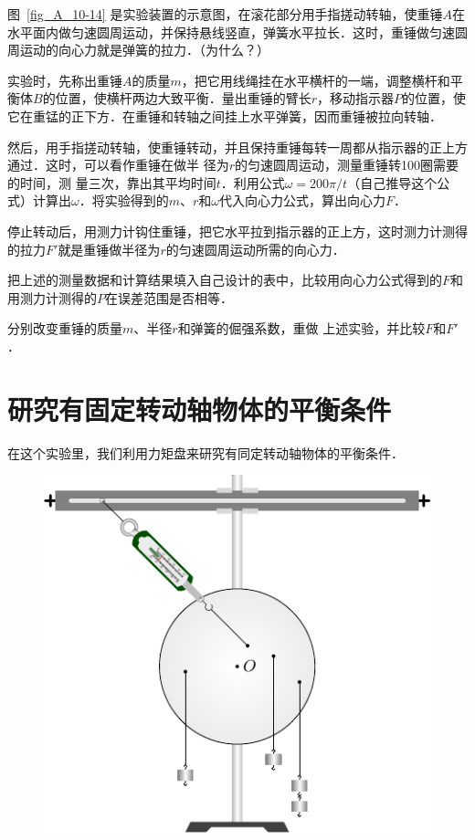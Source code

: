 图~\ref{fig_A_10-14} 是实验装置的示意图，在滚花部分用手指搓动转轴，使重锤$A$在水平面内做匀速圆周运动，并保持悬线竖直，弹簧水平拉长．这时，重锤做匀速圆周运动的向心力就是弹簧的拉力．（为什么？）

实验时，先称出重锤$A$的质量$m$，把它用线绳挂在水平横杆的一端，调整横杆和平衡体$B$的位置，使横杆两边大致平衡．量出重锤的臂长$r$，移动指示器$P$的位置，使它在重锰的正下方．在重锤和转轴之间挂上水平弹簧，因而重锤被拉向转轴．

然后，用手指搓动转轴，使重锤转动，并且保持重锤每转一周都从指示器的正上方通过．这时，可以看作重锤在做半
径为$r$的匀速圆周运动，测量重锤转100圈需要的时间，测
量三次，靠出其平均时间$t$．利用公式$\omega=200\pi/t$（自己推导这个公式）计算出$\omega$．将实验得到的$m$、$r$和$\omega$代入向心力公式，算出向心力$F$．

停止转动后，用测力计钩住重锤，把它水平拉到指示器的正上方，这时测力计测得的拉力$F'$就是重锤做半径为$r$的匀速圆周运动所需的向心力．

把上述的测量数据和计算结果填入自己设计的表中，比较用向心力公式得到的$F$和用测力计测得的$P$在误差范围是否相等．

分别改变重锤的质量$m$、半径$r$和弹簧的倔强系数，重做
上述实验，并比较$F$和$F'$．

\section{研究有固定转动轴物体的平衡条件}
在这个实验里，我们利用力矩盘来研究有同定转动轴物体的平衡条件．
\begin{figure}[htbp]
    \centering
    \includegraphics{fig/A/10-15.pdf}
    \caption{}\label{fig_A_10-15}
\end{figure}

